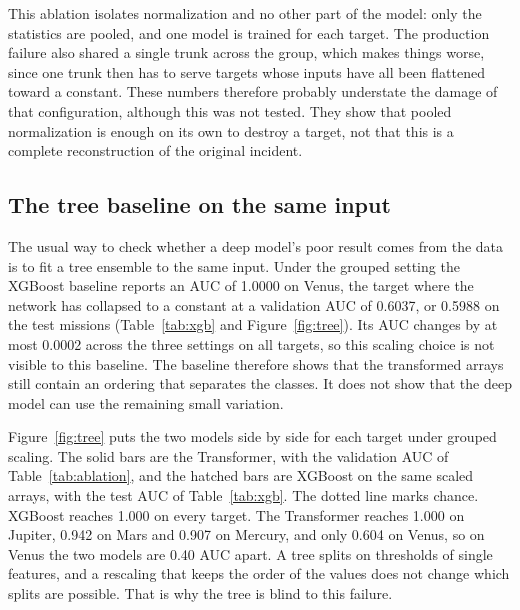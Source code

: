 This ablation isolates normalization and no other part of the model: only the statistics are pooled, and one model is trained for each target. The production failure also shared a single trunk across the group, which makes things worse, since one trunk then has to serve targets whose inputs have all been flattened toward a constant. These numbers therefore probably understate the damage of that configuration, although this was not tested. They show that pooled normalization is enough on its own to destroy a target, not that this is a complete reconstruction of the original incident.

\subsection{The tree baseline on the same input}
\label{sec:tree}

The usual way to check whether a deep model's poor result comes from the data is to fit a tree ensemble to the same input. Under the grouped setting the XGBoost baseline reports an AUC of 1.0000 on Venus, the target where the network has collapsed to a constant at a validation AUC of 0.6037, or 0.5988 on the test missions (Table~\ref{tab:xgb} and Figure~\ref{fig:tree}). Its AUC changes by at most 0.0002 across the three settings on all targets, so this scaling choice is not visible to this baseline. The baseline therefore shows that the transformed arrays still contain an ordering that separates the classes. It does not show that the deep model can use the remaining small variation.



Figure~\ref{fig:tree} puts the two models side by side for each target under grouped scaling. The solid bars are the Transformer, with the validation AUC of Table~\ref{tab:ablation}, and the hatched bars are XGBoost on the same scaled arrays, with the test AUC of Table~\ref{tab:xgb}. The dotted line marks chance. XGBoost reaches 1.000 on every target. The Transformer reaches 1.000 on Jupiter, 0.942 on Mars and 0.907 on Mercury, and only 0.604 on Venus, so on Venus the two models are 0.40 AUC apart. A tree splits on thresholds of single features, and a rescaling that keeps the order of the values does not change which splits are possible. That is why the tree is blind to this failure.

